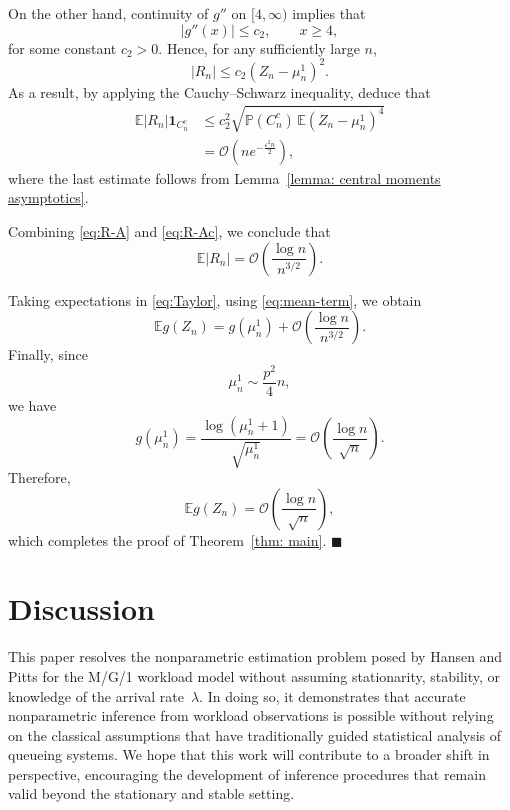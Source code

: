 \documentclass[12pt]{article}
\newcommand{\1}{\mathbf{1}}
\begin{document}
On the other hand,
continuity of
$g''$
on
$[4,\infty)$
implies that
\[
|g''(x)|
\le
c_2,
\qquad
x\ge4,
\]
for some constant
$c_2>0$.
Hence, for any sufficiently large $n$, 
\[
|R_n|
\le
c_2
(Z_n-\mu_n^1)^2.
\]
As a result, by applying the Cauchy--Schwarz inequality, deduce that
\begin{align}
\mathbb E
|R_n|
\mathbf1_{C_n^c}
&\le
c_2^2
\sqrt{
\mathbb P(C_n^c)
\,
\mathbb E
(Z_n-\mu_n^1)^4
}
\nonumber\\
&=
\mathcal O
\!\left(
n
e^{-\frac{\varepsilon^2n}{2}}
\right),
\label{eq:R-Ac}
\end{align}
where the last estimate follows from
Lemma~\ref{lemma: central moments asymptotics}.

Combining
\eqref{eq:R-A}
and
\eqref{eq:R-Ac},
we conclude that
\[
\mathbb E|R_n|
=
\mathcal O
\!\left(
\frac{\log n}{n^{3/2}}
\right).
\]

Taking expectations in
\eqref{eq:Taylor},
using
\eqref{eq:mean-term},
we obtain
\[
\mathbb Eg(Z_n)
=
g(\mu_n^1)
+
\mathcal O
\!\left(
\frac{\log n}{n^{3/2}}
\right).
\]
Finally,
since
\[
\mu_n^1
\sim
\frac{p^2}{4}n,
\]
we have
\[
g(\mu_n^1)
=
\frac{\log(\mu_n^1+1)}
{\sqrt{\mu_n^1}}
=
\mathcal O
\!\left(
\frac{\log n}{\sqrt n}
\right).
\]
Therefore,
\[
\mathbb Eg(Z_n)
=
\mathcal O
\!\left(
\frac{\log n}{\sqrt n}
\right),
\]
which completes the proof of
Theorem~\ref{thm: main}. $\blacksquare$

\section{Discussion}\label{sec: discussion} This paper resolves the nonparametric estimation problem posed by Hansen and Pitts \cite{Hansen2006} for the M/G/1 workload model without assuming stationarity, stability, or knowledge of the arrival rate~$\lambda$. In doing so, it demonstrates that accurate nonparametric inference from workload observations is possible without relying on the classical assumptions that have traditionally guided statistical analysis of queueing systems. We hope that this work will contribute to a broader shift in perspective, encouraging the development of inference procedures that remain valid beyond the stationary and stable setting.

\end{document}
